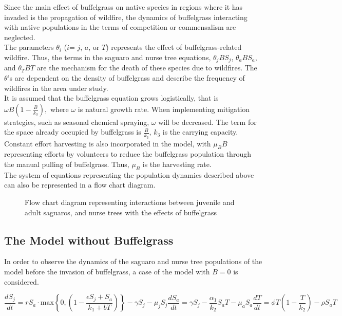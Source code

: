 \documentclass[a4paper]{article}
\begin{document}
Since the main effect of buffelgrass on native species in regions where it has invaded is the propagation of wildfire, the dynamics of buffelgrass interacting with native populations in the terms of competition or commensalism are neglected.\\

The parameters $\theta_i$ ($i$= $j$, $a$, or $T$) represents the effect of buffelgrass-related wildfire. Thus, the terms in the saguaro and nurse tree equations, $\theta_j B S_j$, $\theta_a B S_a$, and $\theta_T B T$ are the mechanism for the death of these species due to wildfires. The $\theta$'s are dependent on the density of buffelgrass and describe the frequency of wildfires in the area under study.\\

It is assumed that the buffelgrass equation grows logistically, that is $\omega B \left(1-\displaystyle\frac{B}{k_3}\right),$ where $\omega$ is natural growth rate. When implementing mitigation strategies, such as seasonal chemical spraying, $\omega$ will be decreased. The term for the space already occupied by buffelgrass is $\displaystyle\frac{B}{k_3}$, $k_3$ is the carrying capacity. Constant effort harvesting is also incorporated in the model, with $\mu_B B$  representing efforts by volunteers to reduce the buffelgrass population through the manual pulling of buffelgrass. Thus, $\mu_B$ is the harvesting rate.\\

The system of equations representing the population dynamics described above can also be represented in a flow chart diagram.
\begin{figure}[H]

\caption{Flow chart diagram representing interactions between juvenile and adult saguaros, and nurse trees with the effects of buffelgrass}
\label{fig:ModelWithBuffel}
\end{figure}

\subsection{The Model without Buffelgrass}
In order to observe the dynamics of the saguaro and nurse tree populations of the model before the invasion of buffelgrass, a case of the model with $B = 0$ is considered.

\begin{subequations}
\begin{equation}\label{SjNobg}
\displaystyle\frac{dS_j}{dt}= rS_a\cdot \text{max}\left\lbrace0,\left(1-\displaystyle\frac{\epsilon S_j + S_a}{k_1+b T}\right)\right\rbrace - \gamma S_j - \mu_j S_j
\end{equation}

\begin{equation}
\displaystyle\frac{dS_a}{dt} = \gamma S_j -\displaystyle\frac{\alpha_1}{k_2}S_a T - \mu_a S_a
\end{equation}

\begin{equation}
\displaystyle\frac{dT}{dt} = \phi T\left(1 - \displaystyle\frac{T}{k_2}\right) - \rho S_a T
\end{equation}
\end{subequations}
\end{document}
